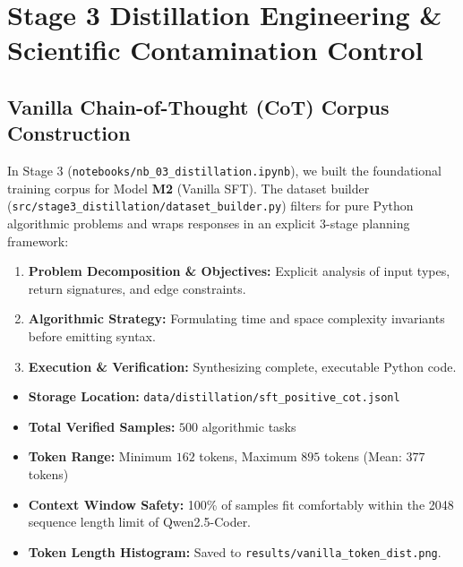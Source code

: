 \documentclass[12pt, a4paper]{article}
\begin{document}
\section{Stage 3 Distillation Engineering \& Scientific Contamination Control}

\subsection{Vanilla Chain-of-Thought (CoT) Corpus Construction}
In Stage 3 (\texttt{notebooks/nb\_03\_distillation.ipynb}), we built the foundational training corpus for Model \textbf{M2} (Vanilla SFT). The dataset builder (\texttt{src/stage3\_distillation/dataset\_builder.py}) filters for pure Python algorithmic problems and wraps responses in an explicit 3-stage planning framework:
\begin{enumerate}[label=(\alph*)]
  \item \textbf{Problem Decomposition \& Objectives:} Explicit analysis of input types, return signatures, and edge constraints.
  \item \textbf{Algorithmic Strategy:} Formulating time and space complexity invariants before emitting syntax.
  \item \textbf{Execution \& Verification:} Synthesizing complete, executable Python code.
\end{enumerate}

\begin{researchbox}[title={\faDatabase\ Distillation Corpus Summary Statistics}]
\begin{itemize}[leftmargin=*]
  \item \textbf{Storage Location:} \texttt{data/distillation/sft\_positive\_cot.jsonl}
  \item \textbf{Total Verified Samples:} $500$ algorithmic tasks
  \item \textbf{Token Range:} Minimum $162$ tokens, Maximum $895$ tokens (Mean: $377$ tokens)
  \item \textbf{Context Window Safety:} 100\% of samples fit comfortably within the 2048 sequence length limit of Qwen2.5-Coder.
  \item \textbf{Token Length Histogram:} Saved to \texttt{results/vanilla\_token_dist.png}.
\end{itemize}
\end{researchbox}
\end{document}
